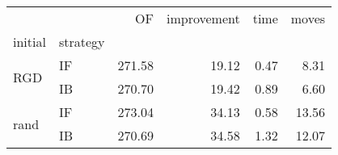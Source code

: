 \begin{tabular}{llrrrr}
\toprule
     &    &     OF &  improvement &  time &  moves \\
initial & strategy &        &              &       &        \\
\midrule
\multirow{2}{*}{RGD} & IF & 271.58 &        19.12 &  0.47 &   8.31 \\
     & IB & 270.70 &        19.42 &  0.89 &   6.60 \\
\cline{1-6}
\multirow{2}{*}{rand} & IF & 273.04 &        34.13 &  0.58 &  13.56 \\
     & IB & 270.69 &        34.58 &  1.32 &  12.07 \\
\bottomrule
\end{tabular}
